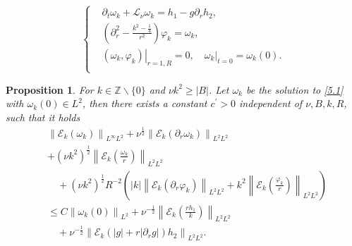 \documentclass[10pt,a4paper]{amsart}
\newtheorem{proposition}{Proposition}
\begin{document}
\begin{equation}\label{5.1}
    \left\{
    \begin{aligned}
    &\partial_t \omega_k+\mathcal{L}_\nu \omega_k=h_1-g\partial_{r}h_2, \\
    &\left(\partial_r^2-\frac{k^2-\frac{1}{4}}{r^2}\right)  \varphi_k=\omega_k,\\
    &\left. (\omega_k,\varphi_k)\right|_{r=1, R}=0, \quad \left. \omega_k\right|_{t=0}=\omega_k(0).\\
\end{aligned}
    \right.
\end{equation}

\begin{proposition} \label{pro5.2}
    For $k \in \mathbb{Z} \backslash\{0\}$ and  $\nu k^2\geq |B|$. Let $\omega_k$ be the solution to \eqref{5.1} with $\omega_k(0) \in L^2$, then there exists a constant $c^{\prime}>0$ independent of $\nu, B, k, R$, such that it holds
    $$
    \begin{aligned}
        &   \left\|\mathcal{E}_k(\omega_k)\right\|_{L^\infty L^2}
        +\nu^{\frac{1}{2}}\left\|\mathcal{E}_k(\partial_{r}\omega_k)\right\|_{L^2L^2}\\
  &+(\nu k^2)^{\frac{1}{2}}\left\|\mathcal{E}_k(\frac{\omega_k}{r})\right\|_{L^2L^2}\\
  & \quad+(\nu k^2)^{\frac{1}{2}} R^{-2}\left(|k|\left\|\mathcal{E}_k(\partial_r \varphi_k)\right\|_{L^2 L^2}+k^2\left\|\mathcal{E}_k(\frac{\varphi_k}{r})\right\|_{L^2 L^2}\right) \\
        &\leq C\left\|\omega_k(0)\right\|_{L^2}+\nu^{-\frac{1}{2}}\left\|\mathcal{E}_k(\frac{rh_1}{k})\right\|_{L^2 L^2}\\
        &\quad+\nu^{-\frac{1}{2}}\left\|\mathcal{E}_k(|g|+r|\partial_{r}g|)h_2\right\|_{L^2L^2}.
    \end{aligned}
    $$
\end{proposition}
\end{document}
